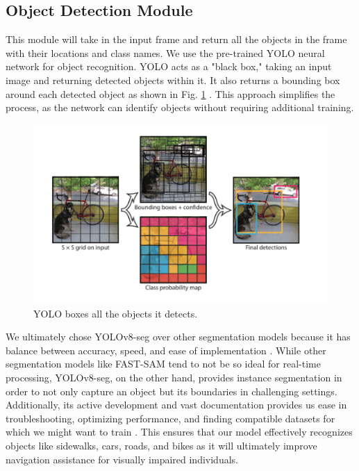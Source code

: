 \documentclass[12pt,a4paper]{article}
\begin{document}
\subsection{Object Detection Module}
This module will take in the input frame and return all the objects in the frame with their locations and class names.
We use the pre-trained YOLO neural network for object recognition. YOLO acts as a "black box," taking an input image and returning detected objects within it. It also returns a bounding box around each detected object as shown in Fig. \ref{yolo} \cite{redmon2018yolov3}. This approach simplifies the process, as the network can identify objects without requiring additional training.

\begin{figure}[ht!]
    \center
    \includegraphics[width=1\linewidth]{yolo.png}
    \caption{YOLO boxes all the objects it detects.}
    \label{yolo}
  \end{figure}

We ultimately chose YOLOv8-seg over other segmentation models because it has balance between accuracy, speed, and ease of implementation \cite{ultralytics2024sam}. While other segmentation models like FAST-SAM tend to not be so ideal for real-time processing, YOLOv8-seg, on the other hand, provides instance segmentation in order to not only capture an object but its boundaries in challenging settings. Additionally, its active development and vast documentation provides us ease in troubleshooting, optimizing performance, and finding compatible datasets for which we might want to train \cite{ultralytics2024sam}. This ensures that our model effectively recognizes objects like sidewalks, cars, roads, and bikes as it will ultimately improve navigation assistance for visually impaired individuals.
\end{document}
